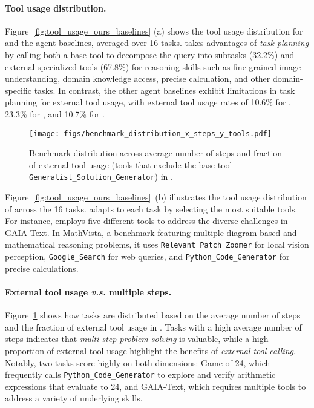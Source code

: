 \paragraph{Tool usage distribution.} Figure~\ref{fig:tool_usage_ours_baselines} (a) shows the tool usage distribution for \model and the agent baselines, averaged over 16 tasks. \model takes advantages of \textit{task planning} by calling both a base tool to decompose the query into subtasks (32.2\%) and external specialized tools (67.8\%) for reasoning skills such as fine-grained image understanding, domain knowledge access, precise calculation, and other domain-specific tasks. In contrast, the other agent baselines exhibit limitations in task planning for external tool usage, with external tool usage rates of 10.6\% for \autogen, 23.3\% for \gptplugin, and 10.7\% for \langchain.


\begin{figure}[th!]
    \centering
    \texttt{[image: figs/benchmark\_distribution\_x\_steps\_y\_tools.pdf]}
    \caption{Benchmark distribution across average number of steps and fraction of external tool usage (tools that exclude the base tool \texttt{Generalist\_Solution\_Generator}) in \model.}
    \label{fig:benchmark_distribution_x_steps_y_tools}
\end{figure}


Figure~\ref{fig:tool_usage_ours_baselines}~(b) illustrates the tool usage distribution of \model across the 16 tasks. \model adapts to each task by selecting the most suitable tools. For instance, \model employs five different tools to address the diverse challenges in GAIA-Text. In MathVista, a benchmark featuring multiple diagram-based and mathematical reasoning problems, it uses \texttt{Relevant\_Patch\_Zoomer} for local vision perception, \texttt{Google\_Search} for web queries, and \texttt{Python\_Code\_Generator} for precise calculations.


\paragraph{External tool usage \textit{v.s.} multiple steps.} 
Figure~\ref{fig:benchmark_distribution_x_steps_y_tools} shows how tasks are distributed based on the average number of steps and the fraction of external tool usage in \model. Tasks with a high average number of steps indicates that \textit{multi-step problem solving} is valuable, while a high proportion of external tool usage highlight the benefits of \textit{external tool calling}. Notably, two tasks score highly on both dimensions: Game of 24, which frequently calls \texttt{Python\_Code\_Generator} to explore and verify arithmetic expressions that evaluate to 24, and GAIA-Text, which requires multiple tools to address a variety of underlying skills.


